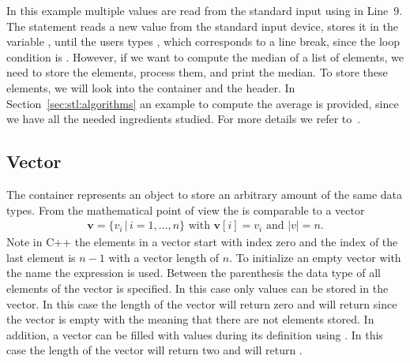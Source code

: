 In this example multiple values are read from the standard input using  in Line~9. The  statement reads a new value from the standard input device, stores it in the variable , until the users types \cpp{\\n}, which corresponds to a line break, since the loop condition is . However, if we want to compute the median of a list of elements, we need to store the elements, process them, and print the median. To store these elements, we will look into the  container and the  header. In Section~\ref{sec:stl:algorithms} an example to compute the average is provided, since we have all the needed ingredients studied. For more details we refer to~\cite[Chapter~3]{andrew2000accelerated}.  



\subsection{Vector}
The container  represents an object to store an arbitrary amount of the same data types. From the mathematical point of view the  is comparable to a vector
\begin{align}
\mathbf{v} = \{v_i \,\vert\, i=1,\ldots,n \} \text{ with } \mathbf{v}[i] = v_i \text{ and }  \vert v\vert = n\text{.} 
\end{align}
Note in C++ the elements in a vector start with index zero and the index of the last element is $n-1$ with a vector length of $n$. To initialize an empty vector with the name  the expression  is used. Between the parenthesis the data type of all elements of the vector is specified. In this case only  values can be stored in the vector. In this case the length of the vector  will return zero and  will return  since the vector is empty with the meaning that there are not elements stored. In addition, a vector can be filled with values during its definition using . In this case the length of the vector  will return two and  will return .\\

